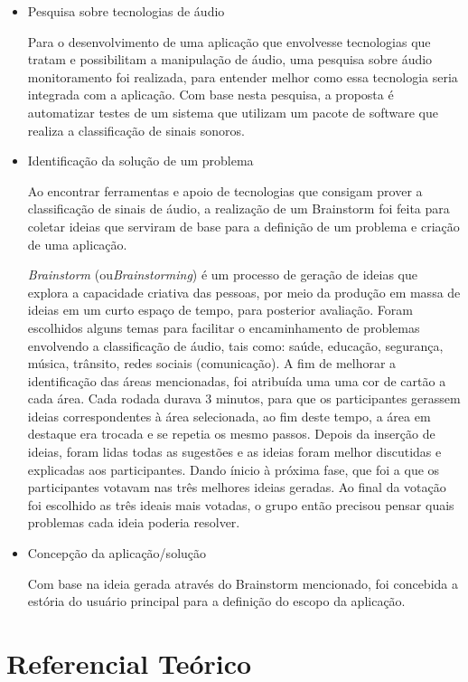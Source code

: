 \begin{itemize}
	\item Pesquisa sobre tecnologias de áudio
	
Para o desenvolvimento de uma aplicação que envolvesse tecnologias que tratam e possibilitam a manipulação de áudio, uma pesquisa sobre áudio monitoramento foi realizada, para entender melhor como essa tecnologia seria integrada com a aplicação. Com base nesta pesquisa, a proposta é automatizar testes de um sistema que utilizam um pacote de software que realiza a classificação de sinais sonoros. 

	\item Identificação da solução de um problema	
	
Ao encontrar ferramentas e apoio de tecnologias que consigam prover a classificação de sinais de áudio,  a realização de um Brainstorm foi feita para coletar ideias que serviram de base para a definição de um problema e criação de uma aplicação.


\textit{Brainstorm} (ou\textit{Brainstorming}) é um processo de geração de ideias que explora a capacidade criativa das pessoas,  por meio da produção em massa de ideias em um curto espaço de tempo, para posterior avaliação. Foram escolhidos alguns temas para facilitar o encaminhamento de problemas envolvendo a classificação de áudio, tais como: saúde, educação, segurança, música, trânsito, redes sociais (comunicação). A fim de melhorar a identificação das áreas mencionadas, foi atribuída uma uma cor de cartão a cada área. Cada rodada durava 3 minutos, para que os participantes gerassem ideias correspondentes à área selecionada, ao fim deste tempo, a área em destaque era trocada e se repetia os mesmo passos. Depois da inserção de ideias, foram lidas todas as sugestões e as ideias foram melhor discutidas e explicadas aos participantes. Dando ínicio à próxima fase, que foi a que os participantes votavam nas três melhores ideias geradas. Ao final da votação foi escolhido as três ideais mais votadas, o grupo então precisou pensar quais problemas cada ideia poderia resolver. 
	
	\item Concepção da aplicação/solução
	
Com base na ideia gerada através do Brainstorm mencionado, foi concebida a estória do usuário principal para a definição do escopo da aplicação.
 
\end{itemize}

\section{Referencial Teórico}

